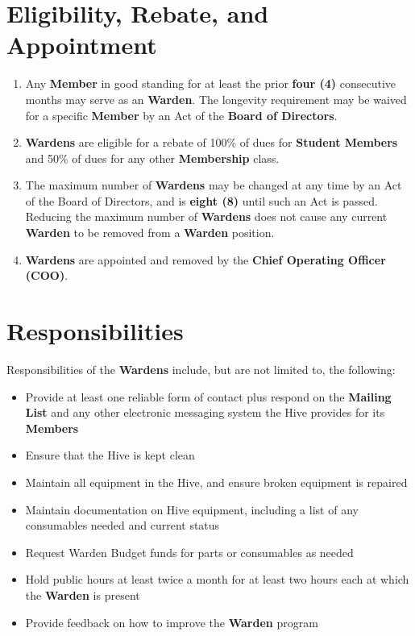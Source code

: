 \documentclass[11pt, oneside]{article}   	%
\begin{document}
\section{Eligibility, Rebate, and Appointment}
\begin{enumerate}
\item Any \textbf{Member} in good standing for at least the prior \textbf{four (4)} consecutive months may serve as an \textbf{Warden}.
The longevity requirement may be waived for a specific \textbf{Member} by an Act of the \textbf{Board of Directors}.
\item \textbf{Wardens} are eligible for a rebate of 100\% of dues for \textbf{Student Members} and 50\% of dues for any other \textbf{Membership} class.
\item The maximum number of \textbf{Wardens} may be changed at any time by an Act of the Board of Directors, and is \textbf{eight (8)} until such an Act is passed.
Reducing the maximum number of \textbf{Wardens} does not cause any current \textbf{Warden} to be removed from a \textbf{Warden} position.
\item \textbf{Wardens} are appointed and removed by the \textbf{Chief Operating Officer (COO)}.
\end{enumerate}

\section{Responsibilities}
Responsibilities of the \textbf{Wardens} include, but are not limited to, the following:
\begin{itemize}[noitemsep]
\item Provide at least one reliable form of contact plus respond on the \textbf{Mailing List} and any other electronic messaging system the Hive provides for its \textbf{Members}
\item Ensure that the Hive is kept clean
\item Maintain all equipment in the Hive, and ensure broken equipment is repaired
\item Maintain documentation on Hive equipment, including a list of any consumables needed and current status
\item Request Warden Budget funds for parts or consumables as needed
\item Hold public hours at least twice a month for at least two hours each at which the \textbf{Warden} is present
\item Provide feedback on how to improve the \textbf{Warden} program
\end{itemize}
\end{document}
